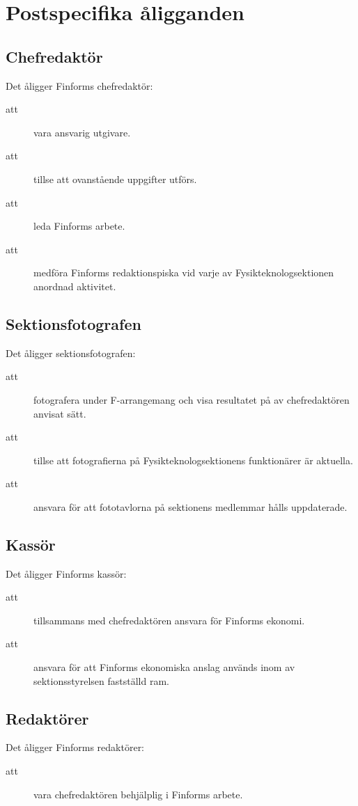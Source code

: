 \section{Postspecifika åligganden}



\subsection{Chefredaktör}
Det åligger Finforms chefredaktör:
    \begin{description}
    \item[att] vara ansvarig utgivare. 
      \item[att] tillse att ovanstående uppgifter utförs.
      \item[att] leda Finforms arbete.
      \item[att] medföra Finforms redaktionspiska vid varje av Fysikteknologsektionen anordnad aktivitet.
    \end{description}

\subsection{Sektionsfotografen}
Det åligger sektionsfotografen:
    \begin{description}
      \item[att] fotografera under F-arrangemang och visa resultatet på av chef\-redak\-tören anvisat sätt.
      \item[att] tillse att fotografierna på Fysikteknologsektionens funktionärer är aktuella.
      \item[att] ansvara för att fototavlorna på sektionens medlemmar hålls uppdaterade.
    \end{description}

\subsection{Kassör}
Det åligger Finforms kassör:
    \begin{description}
      \item[att] tillsammans med chefredaktören ansvara för Finforms ekonomi.
      \item[att] ansvara för att Finforms ekonomiska anslag används inom av sektionsstyrelsen fastställd ram.
    \end{description}

\subsection{Redaktörer}
Det åligger Finforms redaktörer:
    \begin{description}
      \item[att] vara chefredaktören behjälplig i Finforms arbete.
    \end{description}

